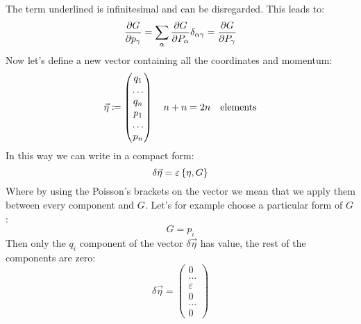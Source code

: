 The term underlined is infinitesimal and can be disregarded. This leads to:
\begin{equation}
    \dfrac{\partial G}{\partial p_{\gamma}} = \displaystyle\sum_{\alpha} \dfrac{\partial G}{\partial P_{\alpha}}\delta_{\alpha \gamma} = \dfrac{\partial G}{\partial P_{\gamma}}
\end{equation}
Now let's define a new vector containing all the coordinates and momentum:
\begin{equation}
    \vec{\eta} \coloneqq \begin{pmatrix}
        q_1\\\dots\\q_n\\p_1\\\dots\\p_n
    \end{pmatrix}
    \quad n+n = 2n \quad \text{elements}
\end{equation}
In this way we can write in a compact form:
\begin{equation}
    \delta \vec{\eta} = \varepsilon \left\{\eta,G\right\}
\end{equation}
Where by using the Poisson's brackets on the vector we mean that we apply them between every component and $G$. Let's for example choose a particular form of $G$:
\begin{equation}
    G = p_i
\end{equation}
Then only the $q_i$ component of the vector $\delta \vec{\eta}$ has value, the rest of the components are zero:
\begin{equation}
    \delta \vec{\eta} = \begin{pmatrix}
        0\\\dots\\\varepsilon\\0\\\dots\\0
    \end{pmatrix}
\end{equation}
